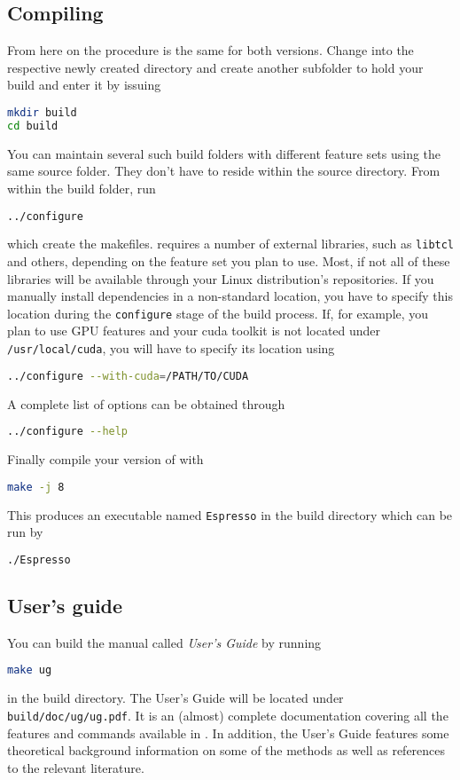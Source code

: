 \documentclass[
paper=a4,                       %
fontsize=11pt,                  %
headinclude=false,              %
footinclude=false,              %
pagesize,                       %
]{scrartcl}
\begin{document}
\subsection{Compiling \es{}}
From here on the procedure is the same for both versions.
Change into the respective newly created \es{} directory and create another subfolder to hold your build and enter it by issuing
\begin{lstlisting}[language=bash]
mkdir build
cd build
\end{lstlisting}
You can maintain several such build folders with different feature sets using the same \es{} source folder. They don't have to reside within the source directory.
%
From within the build folder, run
%
\begin{lstlisting}[language=bash]
../configure
\end{lstlisting}
%
which create the makefiles. \es{} requires a number of external libraries, such as \texttt{libtcl} and others, depending on the feature set you plan to use. Most, if not all of these libraries will be available through your Linux distribution's repositories. If you manually install dependencies in a non-standard location, you have to specify this location during the \texttt{configure} stage of the build process. If, for example, you plan to use GPU features and your cuda toolkit is not located under \texttt{/usr/local/cuda}, you will have to specify its location using
%
\begin{lstlisting}[language=bash]
../configure --with-cuda=/PATH/TO/CUDA
\end{lstlisting}
%
A complete list of options can be obtained through
\begin{lstlisting}[language=bash]
../configure --help
\end{lstlisting}

Finally compile your version of \es{} with
%
\begin{lstlisting}[language=bash]
make -j 8
\end{lstlisting}
%
This produces an executable named \verb!Espresso! in the build directory which can be run by
\begin{lstlisting}[language=bash]
./Espresso
\end{lstlisting}

\subsection{User's guide}
You can build the \es{} manual called \emph{\es{} User's Guide} by running
\begin{lstlisting}[language=bash]
make ug
\end{lstlisting}
in the build directory. The User's Guide will be located under \texttt{build/doc/ug/ug.pdf}. It is an (almost) complete documentation covering all the features and commands available in \es{}. In addition, the User's Guide features some theoretical background information on some of the methods as well as references to the relevant literature.
\end{document}
